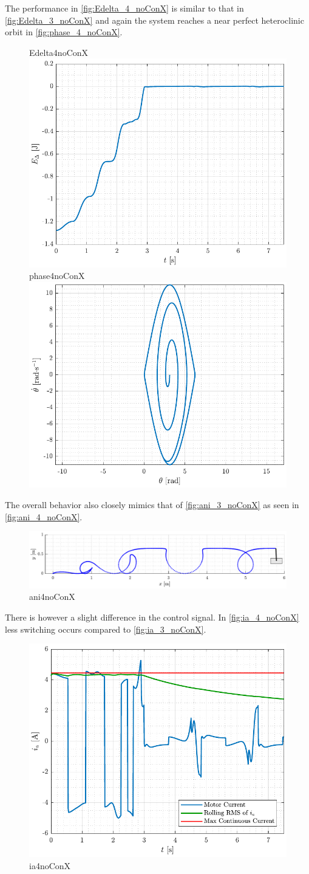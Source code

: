 The performance in \autoref{fig:Edelta_4_noConX} is similar to that in \autoref{fig:Edelta_3_noConX} and again the system reaches a near perfect heteroclinic orbit in \autoref{fig:phase_4_noConX}.
%
\begin{figure}[H]
  \hspace{-10pt}
  \captionbox
  {
    Edelta4noConX
    \label{fig:Edelta_4_noConX}
  }
  {
    \hspace{-1cm}
    \includegraphics[width=.46\textwidth]{figures/Edelta_4_noConX}
  }
  \hspace{20pt}
  \captionbox 
  {
    phase4noConX
    \label{fig:phase_4_noConX}
  }
  {
    \hspace{-1cm}
    \includegraphics[width=.46\textwidth]{figures/phase_4_noConX}
  }  
\end{figure}
%
The overall behavior also closely mimics that of \autoref{fig:ani_3_noConX} as seen in \autoref{fig:ani_4_noConX}.
\begin{figure}[H]
  \includegraphics[width=.7\textwidth]{figures/ani_4_noConX}
  \caption{ani4noConX}
  \label{fig:ani_4_noConX}
\end{figure}
%
There is however a slight difference in the control signal. In \autoref{fig:ia_4_noConX} less switching occurs compared to \autoref{fig:ia_3_noConX}. 
\begin{figure}[H]
  \includegraphics[width=.52\textwidth]{figures/ia_4_noConX}
  \caption{ia4noConX}
  \label{fig:ia_4_noConX}
\end{figure}
